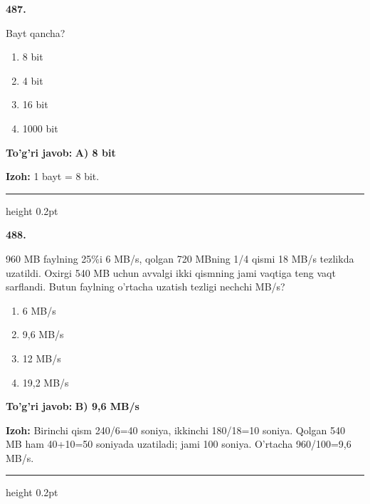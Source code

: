 \documentclass[10pt,a4paper,oneside]{article}
\begin{document}
\noindent\textbf{\color{ink}487.}
\par
Bayt qancha?
\begin{enumerate}[label=\Alph*),leftmargin=9mm]
\item 8 bit
\item 4 bit
\item 16 bit
\item 1000 bit
\end{enumerate}
\begin{tcolorbox}[enhanced,breakable,colback=teal!4,colframe=teal!50!black,boxrule=0.5pt,arc=1.1mm,left=3mm,right=3mm,top=1.7mm,bottom=1.7mm,before skip=2mm,after skip=2mm]
\textbf{\color{teal}To'g'ri javob:} \textbf{A) 8 bit}
\par\smallskip
\textbf{Izoh:} 1 bayt = 8 bit.
\end{tcolorbox}
\vspace{2mm}\hrule height 0.2pt \vspace{3mm}

\noindent\textbf{\color{ink}488.}
\par
960 MB faylning 25\%i 6 MB/s, qolgan 720 MBning 1/4 qismi 18 MB/s tezlikda uzatildi. Oxirgi 540 MB uchun avvalgi ikki qismning jami vaqtiga teng vaqt sarflandi. Butun faylning o'rtacha uzatish tezligi nechchi MB/s?
\begin{enumerate}[label=\Alph*),leftmargin=9mm]
\item 6 MB/s
\item 9,6 MB/s
\item 12 MB/s
\item 19,2 MB/s
\end{enumerate}
\begin{tcolorbox}[enhanced,breakable,colback=teal!4,colframe=teal!50!black,boxrule=0.5pt,arc=1.1mm,left=3mm,right=3mm,top=1.7mm,bottom=1.7mm,before skip=2mm,after skip=2mm]
\textbf{\color{teal}To'g'ri javob:} \textbf{B) 9,6 MB/s}
\par\smallskip
\textbf{Izoh:} Birinchi qism 240/6=40 soniya, ikkinchi 180/18=10 soniya. Qolgan 540 MB ham 40+10=50 soniyada uzatiladi; jami 100 soniya. O'rtacha 960/100=9,6 MB/s.
\end{tcolorbox}
\vspace{2mm}\hrule height 0.2pt \vspace{3mm}
\end{document}
